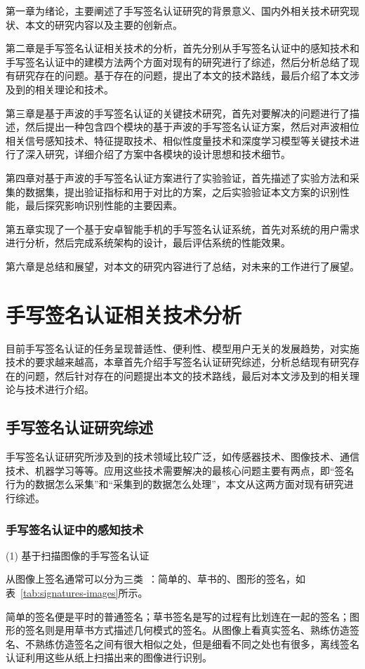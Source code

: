 第一章为绪论，主要阐述了手写签名认证研究的背景意义、国内外相关技术研究现状、本文的研究内容以及主要的创新点。

第二章是手写签名认证相关技术的分析，首先分别从手写签名认证中的感知技术和手写签名认证中的建模方法两个方面对现有的研究进行了综述，然后分析总结了现有研究存在的问题。基于存在的问题，提出了本文的技术路线，最后介绍了本文涉及到的相关理论和技术。

第三章是基于声波的手写签名认证的关键技术研究，首先对要解决的问题进行了描述，然后提出一种包含四个模块的基于声波的手写签名认证方案，然后对声波相位相关信号感知技术、特征提取技术、相似性度量技术和深度学习模型等关键技术进行了深入研究，详细介绍了方案中各模块的设计思想和技术细节。

第四章对基于声波的手写签名认证方案进行了实验验证，首先描述了实验方法和采集的数据集，提出验证指标和用于对比的方案，之后实验验证本文方案的识别性能，最后探究影响识别性能的主要因素。

第五章实现了一个基于安卓智能手机的手写签名认证系统，首先对系统的用户需求进行分析，然后完成系统架构的设计，最后评估系统的性能效果。

第六章是总结和展望，对本文的研究内容进行了总结，对未来的工作进行了展望。

\chapter{手写签名认证相关技术分析}
\label{chap:related-work}
目前手写签名认证的任务呈现普适性、便利性、模型用户无关的发展趋势，对实施技术的要求越来越高，本章首先介绍手写签名认证研究综述，分析总结现有研究存在的问题，然后针对存在的问题提出本文的技术路线，最后对本文涉及到的相关理论与技术进行介绍。
\section{手写签名认证研究综述}
手写签名认证研究所涉及到的技术领域比较广泛，如传感器技术、图像技术、通信技术、机器学习等等。应用这些技术需要解决的最核心问题主要有两点，即“签名行为的数据怎么采集”和“采集到的数据怎么处理”，本文从这两方面对现有研究进行综述。
\subsection{手写签名认证中的感知技术}
(1) 基于扫描图像的手写签名认证

从图像上签名通常可以分为三类~\cite{Hanmandlu2005Off}：简单的、草书的、图形的签名，如表~\ref{tab:signatures-images}所示。

简单的签名便是平时的普通签名；草书签名是写的过程有比划连在一起的签名；图形的签名则是用草书方式描述几何模式的签名。从图像上看真实签名、熟练仿造签名、不熟练仿造签名之间有很大相似之处，但是细看不同之处也有很多，离线签名认证利用这些从纸上扫描出来的图像进行识别。

